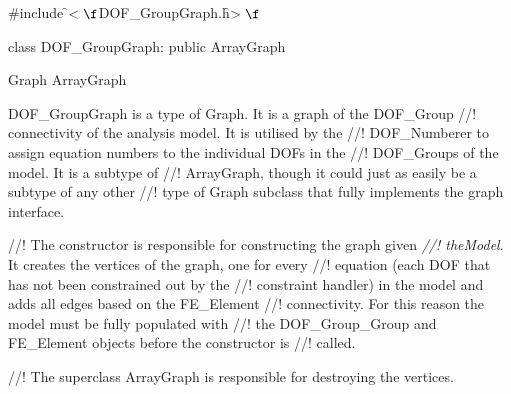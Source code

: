 

\indent \#include \f$<\f$DOF\_GroupGraph.h\f$>\f$

\indent class DOF\_GroupGraph: public ArrayGraph

\indent Graph
\indent\indent ArrayGraph
\indent\indent{}

\indent DOF\_GroupGraph is a type of Graph. It is a graph of the DOF\_Group
//! connectivity of the analysis model. It is utilised by the
//! DOF\_Numberer to assign equation numbers to the individual DOFs in the
//! DOF\_Groups of the model. It is a subtype of
//! ArrayGraph, though it could just as easily be a subtype of any other
//! type of Graph subclass that fully implements the graph interface. 

//! The constructor is responsible for constructing the graph given {\em
//! theModel}. It creates the vertices of the graph, one for every
//! equation  (each DOF that has not been constrained out by the
//! constraint handler)  in the model and adds all edges based on the FE\_Element
//! connectivity. For this reason the model must be fully populated with
//! the DOF\_Group\_Group and FE\_Element objects before the constructor is
//! called.

//! The superclass ArrayGraph is responsible for destroying the vertices.


